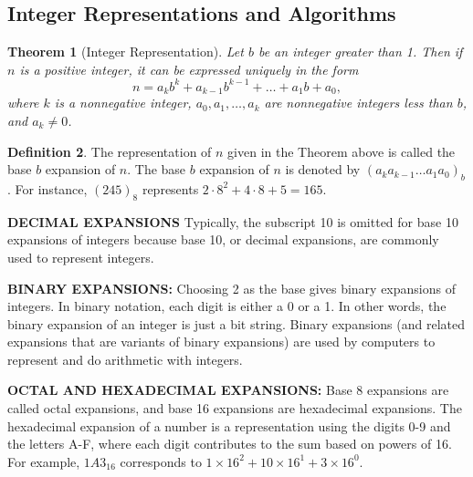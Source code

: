 \documentclass[letterpaper,10pt]{article}
\theoremstyle{plain}
\newtheorem{thm}{Theorem}[section]
\theoremstyle{definition}
\newtheorem{defn}[thm]{Definition}
\theoremstyle{remark}
\begin{document}
\subsection{Integer Representations and Algorithms}
\begin{thm}[Integer Representation]
Let \(b\) be an integer greater than 1. Then if \(n\) is a positive integer, it can be expressed uniquely in the form
\[n = a_k b^k + a_{k-1} b^{k-1} + \ldots + a_1 b + a_0,\]
where \(k\) is a nonnegative integer, \(a_0, a_1, \ldots, a_k\) are nonnegative integers less than \(b\), and \(a_k \neq 0\).
\end{thm}
\begin{defn}
The representation of \(n\) given in the Theorem above is called the base \(b\) expansion of \(n\). The base \(b\) expansion of \(n\) is denoted by \((a_k a_{k-1} \ldots a_1a_0)_b\). For instance, \((245)_8\) represents \(2 \cdot 8^2 + 4 \cdot 8 + 5 = 165\). 

\textbf{DECIMAL EXPANSIONS} Typically, the subscript 10 is omitted for base 10 expansions of integers because base 10, or decimal expansions, are commonly used to represent integers.

\textbf{BINARY EXPANSIONS:} Choosing 2 as the base gives binary expansions of integers. In binary notation, each digit is either a 0 or a 1. In other words, the binary expansion of an integer is just a bit string. Binary expansions (and related expansions that are variants of binary expansions) are used by computers to represent and do arithmetic with integers.

\textbf{OCTAL AND HEXADECIMAL EXPANSIONS:} Base 8 expansions are called octal expansions, and base 16 expansions are hexadecimal expansions.
The hexadecimal expansion of a number is a representation using the digits 0-9 and the letters A-F, where each digit contributes to the sum based on powers of 16. For example, $1A3_{16}$ corresponds to $1 \times 16^2 + 10 \times 16^1 + 3 \times 16^0$.

\end{defn}
\end{document}
